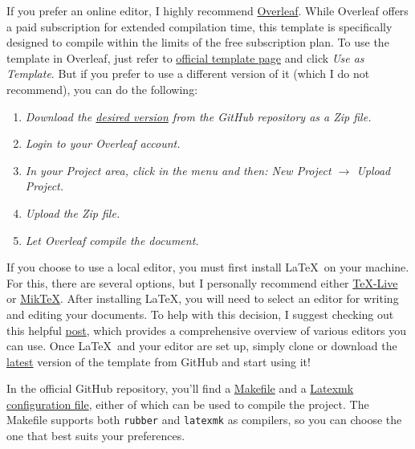 If you prefer an online editor, I highly recommend \href{https://www.overleaf.com/}{Overleaf}. While Overleaf offers a paid subscription for extended compilation time, this template is specifically designed to compile within the limits of the free subscription plan. To use the template in Overleaf, just refer to \href{https://www.overleaf.com/latex/templates/unofficial-polytechnic-university-of-leiria-estg-thesis-slash-report-template/tqgbrncfhwgt}{official template page} and click \textit{Use as Template}. But if you prefer to use a different version of it (which I do not recommend), you can do the following:

\begin{enumerate}[font=\itshape]
	\setlength{\itemsep}{.375em}
	\item \textit{Download the \href{https://github.com/joseareia/ipleiria-thesis/releases}{desired version} from the GitHub repository as a Zip file.}
	\item \textit{Login to your Overleaf account.}
	\item \textit{In your Project area, click in the menu and then: New Project \(\to\) Upload Project.}
	\item \textit{Upload the Zip file.}
	\item \textit{Let Overleaf compile the document.}
\end{enumerate}

If you choose to use a local editor, you must first install \LaTeX~on your machine. For this, there are several options, but I personally recommend either \href{https://www.tug.org/texlive/}{TeX-Live} or \href{https://miktex.org/}{MikTeX}. After installing \LaTeX, you will need to select an editor for writing and editing your documents. To help with this decision, I suggest checking out this helpful \href{https://tex.stackexchange.com/questions/339/latex-editors-ides}{post}, which provides a comprehensive overview of various editors you can use. Once \LaTeX~and your editor are set up, simply clone or download the \href{https://github.com/joseareia/ipleiria-thesis/releases}{latest} version of the template from GitHub and start using it!

\begin{block}[tip]
	In the official GitHub repository, you'll find a \href{https://github.com/joseareia/ipleiria-thesis/blob/master/Makefile}{Makefile} and a \href{https://github.com/joseareia/ipleiria-thesis/blob/master/.latexmkrc}{Latexmk configuration file}, either of which can be used to compile the project. The Makefile supports both \texttt{rubber} and \texttt{latexmk} as compilers, so you can choose the one that best suits your preferences.
\end{block}

